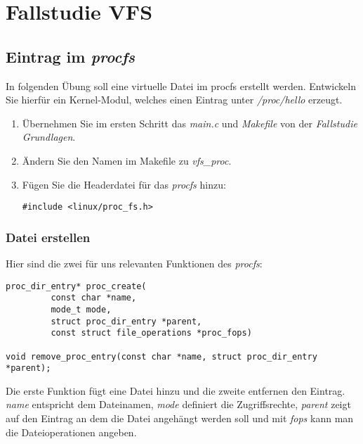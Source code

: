\section{Fallstudie VFS}

\subsection{Eintrag im \emph{procfs}}

In folgenden Übung soll eine virtuelle Datei im procfs erstellt werden. Entwickeln Sie hierfür ein Kernel-Modul,
welches einen Eintrag unter \emph{/proc/hello} erzeugt. \\

\begin{enumerate}
   \item Übernehmen Sie im ersten Schritt das \emph{main.c} und \emph{Makefile} von der \emph{Fallstudie Grundlagen}. 
   \item Ändern Sie den Namen im Makefile zu \emph{vfs\_proc}. 
   \item Fügen Sie die Headerdatei für das \emph{procfs} hinzu:
\begin{lstlisting}
#include <linux/proc_fs.h>
\end{lstlisting}
\end{enumerate}

\subsubsection{Datei erstellen}

Hier sind die zwei für uns relevanten Funktionen des \emph{procfs}:
\begin{lstlisting}
proc_dir_entry* proc_create(
         const char *name, 
         mode_t mode, 
         struct proc_dir_entry *parent, 
         const struct file_operations *proc_fops)

void remove_proc_entry(const char *name, struct proc_dir_entry *parent);
\end{lstlisting}

Die erste Funktion fügt eine Datei hinzu und die zweite entfernen den Eintrag. \emph{name} entspricht dem Dateinamen,
\emph{mode} definiert die Zugriffsrechte, \emph{parent} zeigt auf den Eintrag an dem die Datei angehängt werden soll
und mit \emph{fops} kann man die Dateioperationen angeben. \\

